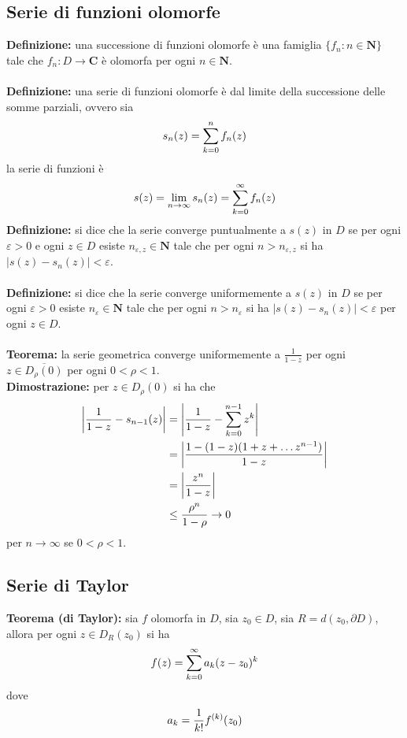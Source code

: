\documentclass{article}
\begin{document}
\subsection{Serie di funzioni olomorfe}
\textbf{Definizione:} una successione di funzioni olomorfe è una famiglia $\{f_n : n \in \mathbf{N}\}$ tale che $f_n : D \longrightarrow \mathbf{C}$ è olomorfa per ogni $n \in \mathbf{N}$. \\ \\
\textbf{Definizione:} una serie di funzioni olomorfe è dal limite della successione delle somme parziali, ovvero sia
\begin{gather}
    s_n(z) = \sum_{k = 0}^n f_n(z) \notag
\end{gather}
la serie di funzioni è
\begin{gather}
    s(z) = \lim_{n \rightarrow \infty}s_n(z) = \sum_{k = 0}^\infty f_n(z) \notag
\end{gather}
\textbf{Definizione:} si dice che la serie converge puntualmente a $s(z)$ in $D$ se per ogni $\varepsilon > 0$ e ogni $z \in D$ esiste $n_{\varepsilon, z} \in \mathbf{N}$ tale che per ogni $n > n_{\varepsilon, z}$ si ha $|s(z) - s_n(z)| < \varepsilon$. \\ \\
\textbf{Definizione:} si dice che la serie converge uniformemente a $s(z)$ in $D$ se per ogni $\varepsilon > 0$ esiste $n_\varepsilon \in \mathbf{N}$ tale che per ogni $n > n_\varepsilon$ si ha $|s(z) - s_n(z)| < \varepsilon$ per ogni $z \in D$. \\ \\
\textbf{Teorema:} la serie geometrica converge uniformemente a $\frac{1}{1 - z}$ per ogni $z \in \overline{D_\rho(0)}$ per ogni $0 < \rho < 1$. \\

\textbf{Dimostrazione:} per $z \in D_\rho(0)$ si ha che
\begin{align}
    \left|\frac{1}{1 - z} - s_{n - 1}(z)\right| &= \left|\frac{1}{1-z} - \sum_{k = 0}^{n - 1}z^k\right| \notag \\
    &= \left|\frac{1 - (1 - z)(1 + z + \dots z^{n-1})}{1 - z}\right| \notag \\
    &= \left|\frac{z^n}{1 - z}\right| \notag \\
    &\leq \frac{\rho^n}{1 - \rho} \rightarrow 0 \notag
\end{align}
per $n \rightarrow \infty$ se $0 < \rho < 1$.

\newpage
\subsection{Serie di Taylor}
\textbf{Teorema (di Taylor):} sia $f$ olomorfa in $D$, sia $z_0 \in D$, sia $R = d(z_0, \partial D)$, allora per ogni $z \in D_R(z_0)$ si ha
\begin{gather}
    f(z) = \sum_{k = 0}^\infty a_k(z - z_0)^k \notag
\end{gather}
dove
\begin{gather}
    a_k = \frac{1}{k!}f^{(k)}(z_0) \notag
\end{gather}
\end{document}
